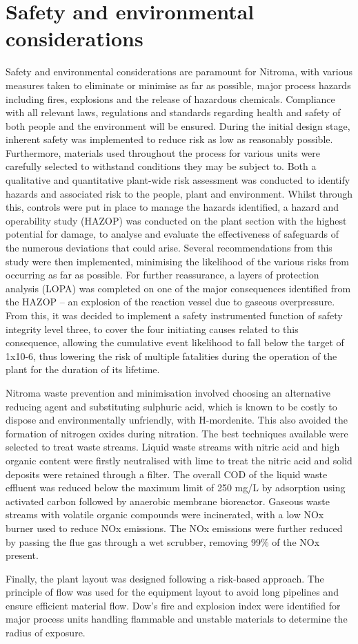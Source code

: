 \section*{Safety and environmental considerations}

Safety and environmental considerations are paramount for Nitroma, with various measures taken to eliminate or minimise as far as possible, major process hazards including fires, explosions and the release of hazardous chemicals. Compliance with all relevant laws, regulations and standards regarding health and safety of both people and the environment will be ensured.  During the initial design stage, inherent safety was implemented to reduce risk as low as reasonably possible. Furthermore, materials used throughout the process for various units were carefully selected to withstand conditions they may be subject to. Both a qualitative and quantitative plant-wide risk assessment was conducted to identify hazards and associated risk to the people, plant and environment. Whilst through this, controls were put in place to manage the hazards identified, a hazard and operability study (HAZOP) was conducted on the plant section with the highest potential for damage, to analyse and evaluate the effectiveness of safeguards of the numerous deviations that could arise. Several recommendations from this study were then implemented, minimising the likelihood of the various risks from occurring as far as possible. For further reassurance, a layers of protection analysis (LOPA) was completed on one of the major consequences identified from the HAZOP – an explosion of the reaction vessel due to gaseous overpressure.  From this, it was decided to implement a safety instrumented function of safety integrity level three, to cover the four initiating causes related to this consequence, allowing the cumulative event likelihood to fall below the target of 1x10-6, thus lowering the risk of multiple fatalities during the operation of the plant for the duration of its lifetime. 

Nitroma waste prevention and minimisation involved choosing an alternative reducing agent and substituting sulphuric acid, which is known to be costly to dispose and environmentally unfriendly, with H-mordenite. This also avoided the formation of nitrogen oxides during nitration. The best techniques available were selected to treat waste streams. Liquid waste streams with nitric acid and high organic content were firstly neutralised with lime to treat the nitric acid and solid deposits were retained through a filter. The overall COD of the liquid waste effluent was reduced below the maximum limit of 250 mg/L by adsorption using activated carbon followed by anaerobic membrane bioreactor. Gaseous waste streams with volatile organic compounds were incinerated, with a low NOx burner used to reduce NOx emissions. The NOx emissions were further reduced by passing the flue gas through a wet scrubber, removing 99\% of the NOx present. 

Finally, the plant layout was designed following a risk-based approach. The principle of flow was used for the equipment layout to avoid long pipelines and ensure efficient material flow. Dow’s fire and explosion index were identified for major process units handling flammable and unstable materials to determine the radius of exposure.  